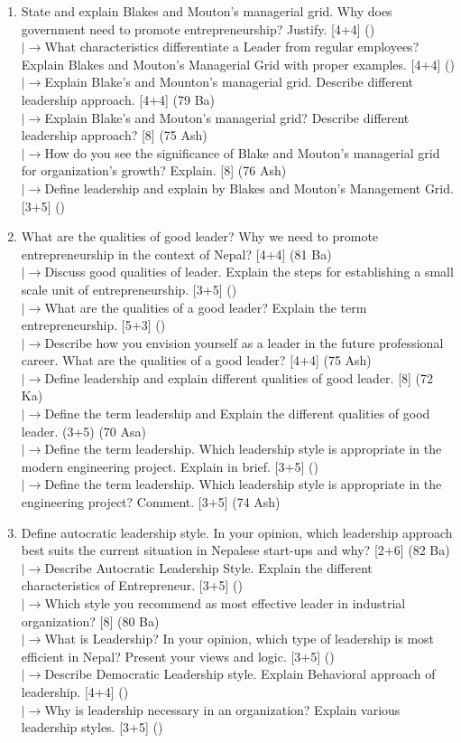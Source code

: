 \documentclass[12pt]{article}
\newcommand{\lb}{\\$\left|\rightarrow\right.$}
\begin{document}
    \begin{enumerate}[topsep=0pt, noitemsep]
      \item State and explain Blakes and Mouton's managerial grid. Why does government need to promote entrepreneurship? Justify. \hfill [4+4] ()
        \lb What characteristics differentiate a Leader from regular employees? Explain Blakes and Mouton's Managerial Grid with proper examples. \hfill [4+4] ()
        \lb Explain Blake's and Mounton's managerial grid. Describe different leadership approach. \hfill [4+4] (79 Ba)
        \lb Explain Blake's and Mouton's managerial grid? Describe different leadership approach? \hfill [8] (75 Ash)
        \lb How do you see the significance of Blake and Mouton's managerial grid for organization's growth? Explain. \hfill [8] (76 Ash)
        \lb Define leadership and explain by Blakes and Mouton's Management Grid. \hfill [3+5] ()

      \item What are the qualities of good leader? Why we need to promote entrepreneurship in the context of Nepal? \hfill [4+4] (81 Ba)
        \lb Discuss good qualities of leader. Explain the steps for establishing a small scale unit of entrepreneurship. \hfill [3+5] ()
        \lb What are the qualities of a good leader? Explain the term entrepreneurship. \hfill [5+3] ()
        \lb Describe how you envision yourself as a leader in the future professional career. What are the qualities of a good leader? \hfill [4+4] (75 Ash)
        \lb Define leadership and explain different qualities of good leader. \hfill [8] (72 Ka)
        \lb Define the term leadership and Explain the different qualities of good leader. \hfill (3+5) (70 Asa)
        \lb Define the term leadership. Which leadership style is appropriate in the modern engineering project. Explain in brief. \hfill [3+5] ()
        \lb Define the term leadership. Which leadership style is appropriate in the engineering project? Comment. \hfill [3+5] (74 Ash)

      \item Define autocratic leadership style. In your opinion, which leadership approach best suits the current situation in Nepalese start-ups and why? \hfill [2+6] (82 Ba)
        \lb Describe Autocratic Leadership Style. Explain the different characteristics of Entrepreneur. \hfill [3+5] ()
        \lb Which style you recommend as most effective leader in industrial organization? \hfill [8] (80 Ba)
        \lb What is Leadership? In your opinion, which type of leadership is most efficient in Nepal? Present your views and logic. \hfill [3+5] ()
        \lb Describe Democratic Leadership style. Explain Behavioral approach of leadership. \hfill [4+4] ()
        \lb Why is leadership necessary in an organization? Explain various leadership styles. \hfill [3+5] ()


\end{enumerate}
\end{document}
